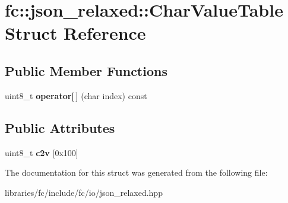 \hypertarget{structfc_1_1json__relaxed_1_1_char_value_table}{}\section{fc\+:\+:json\+\_\+relaxed\+:\+:Char\+Value\+Table Struct Reference}
\label{structfc_1_1json__relaxed_1_1_char_value_table}
\subsection*{Public Member Functions}
\begin{DoxyCompactItemize}
\item 
\mbox{\label{structfc_1_1json__relaxed_1_1_char_value_table_a521d7126931677e3557e2d358308a3a6}} 
uint8\+\_\+t {\bfseries operator\mbox{[}$\,$\mbox{]}} (char index) const
\end{DoxyCompactItemize}
\subsection*{Public Attributes}
\begin{DoxyCompactItemize}
\item 
\mbox{\label{structfc_1_1json__relaxed_1_1_char_value_table_a091cb79d8057a96fa53c4aa323dc32dd}} 
uint8\+\_\+t {\bfseries c2v} \mbox{[}0x100\mbox{]}
\end{DoxyCompactItemize}


The documentation for this struct was generated from the following file\+:\begin{DoxyCompactItemize}
\item 
libraries/fc/include/fc/io/json\+\_\+relaxed.\+hpp\end{DoxyCompactItemize}
